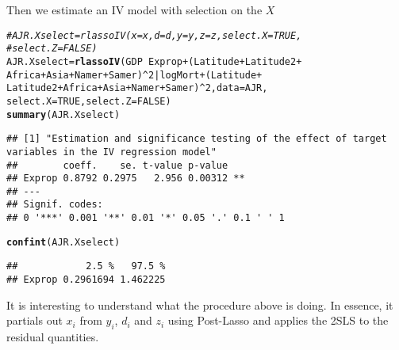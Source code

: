 \documentclass{amsart}\usepackage[]{graphicx}\usepackage[]{color}
\makeatletter
\newcommand{\hlnum}[1]{\textcolor[rgb]{0.686,0.059,0.569}{#1}}%
\newcommand{\hlcom}[1]{\textcolor[rgb]{0.678,0.584,0.686}{\textit{#1}}}%
\newcommand{\hlopt}[1]{\textcolor[rgb]{0,0,0}{#1}}%
\newcommand{\hlstd}[1]{\textcolor[rgb]{0.345,0.345,0.345}{#1}}%
\newcommand{\hlkwb}[1]{\textcolor[rgb]{0.69,0.353,0.396}{#1}}%
\newcommand{\hlkwc}[1]{\textcolor[rgb]{0.333,0.667,0.333}{#1}}%
\newcommand{\hlkwd}[1]{\textcolor[rgb]{0.737,0.353,0.396}{\textbf{#1}}}%
\newenvironment{kframe}{%
 \def\at@end@of@kframe{}%
 \ifinner\ifhmode%
  \def\at@end@of@kframe{\end{minipage}}%
  \begin{minipage}{\columnwidth}%
 \fi\fi%
 \def\FrameCommand##1{\hskip\@totalleftmargin \hskip-\fboxsep
 \colorbox{shadecolor}{##1}\hskip-\fboxsep
     \hskip-\linewidth \hskip-\@totalleftmargin \hskip\columnwidth}%
 \MakeFramed {\advance\hsize-\width
   \@totalleftmargin\z@ \linewidth\hsize
   \@setminipage}}%
 {\par\unskip\endMakeFramed%
 \at@end@of@kframe}
\newenvironment{knitrout}{}{} %
\makeatother
\begin{document}
Then we estimate an IV model with selection on the $X$
\begin{knitrout}
\color{fgcolor}\begin{kframe}
\begin{alltt}
\hlcom{# AJR.Xselect = rlassoIV(x=x, d=d, y=y, z=z, select.X=TRUE,}
\hlcom{# select.Z=FALSE)}
\hlstd{AJR.Xselect} \hlkwb{=} \hlkwd{rlassoIV}\hlstd{(GDP} \hlopt{~} \hlstd{Exprop} \hlopt{+} \hlstd{(Latitude} \hlopt{+} \hlstd{Latitude2} \hlopt{+}
    \hlstd{Africa} \hlopt{+} \hlstd{Asia} \hlopt{+} \hlstd{Namer} \hlopt{+} \hlstd{Samer)}\hlopt{^}\hlnum{2} \hlopt{|} \hlstd{logMort} \hlopt{+} \hlstd{(Latitude} \hlopt{+}
    \hlstd{Latitude2} \hlopt{+} \hlstd{Africa} \hlopt{+} \hlstd{Asia} \hlopt{+} \hlstd{Namer} \hlopt{+} \hlstd{Samer)}\hlopt{^}\hlnum{2}\hlstd{,} \hlkwc{data} \hlstd{= AJR,}
    \hlkwc{select.X} \hlstd{=} \hlnum{TRUE}\hlstd{,} \hlkwc{select.Z} \hlstd{=} \hlnum{FALSE}\hlstd{)}
\hlkwd{summary}\hlstd{(AJR.Xselect)}
\end{alltt}
\begin{verbatim}
## [1] "Estimation and significance testing of the effect of target variables in the IV regression model"
##        coeff.    se. t-value p-value   
## Exprop 0.8792 0.2975   2.956 0.00312 **
## ---
## Signif. codes:  
## 0 '***' 0.001 '**' 0.01 '*' 0.05 '.' 0.1 ' ' 1
\end{verbatim}
\begin{alltt}
\hlkwd{confint}\hlstd{(AJR.Xselect)}
\end{alltt}
\begin{verbatim}
##            2.5 %   97.5 %
## Exprop 0.2961694 1.462225
\end{verbatim}
\end{kframe}
\end{knitrout}

It is interesting to understand what the procedure above is doing.
 In essence, it partials out $x_i$ from $y_i$, $d_i$ and $z_i$ using Post-Lasso and applies the 2SLS to the residual quantities. 
\end{document}
